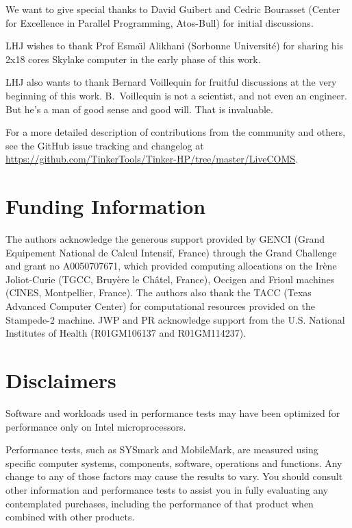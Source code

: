 \documentclass[9pt,comparison]{livecoms}
\newcommand{\githubrepository}{\url{https://github.com/TinkerTools/Tinker-HP/tree/master/LiveCOMS}}  %
\begin{document}
\hspace{\parindent}We want to give special thanks to David Guibert and Cedric Bourasset (Center for Excellence in Parallel Programming, Atos-Bull) for initial discussions.

LHJ wishes to thank Prof Esma\"\i l Alikhani (Sorbonne Université) for sharing his 2x18 cores Skylake computer in the early phase of this work. 

LHJ also wants to thank Bernard Voillequin for fruitful discussions at the very beginning of this work. B.~Voillequin is not a scientist, and not even an engineer. But he's a man of good sense and good will. That is invaluable.

For a more detailed description  of contributions from the community and others, see the GitHub issue tracking and changelog at \githubrepository.

\section{Funding Information}
\hspace{\parindent}The authors acknowledge the generous support provided by GENCI (Grand Equipement National de Calcul Intensif, France) through the Grand Challenge and grant no A0050707671, which provided computing allocations on the Irène Joliot-Curie (TGCC, Bruyère le Châtel, France), Occigen and Frioul machines (CINES, Montpellier, France). The authors also thank the TACC (Texas Advanced Computer Center) for computational resources provided on the Stampede-2 machine. JWP and PR acknowledge support from the U.S. National Institutes of Health (R01GM106137 and R01GM114237).

\section*{Disclaimers}
\hspace{\parindent} Software and workloads used in performance tests may have been optimized for performance only on Intel microprocessors.

Performance tests, such as SYSmark and MobileMark, are measured using specific computer systems, components, software, operations and functions. Any change to any of those factors may cause the results to vary. You should consult other information and performance tests to assist you in fully evaluating any contemplated purchases, including the performance of that product when combined with other products.
\end{document}
